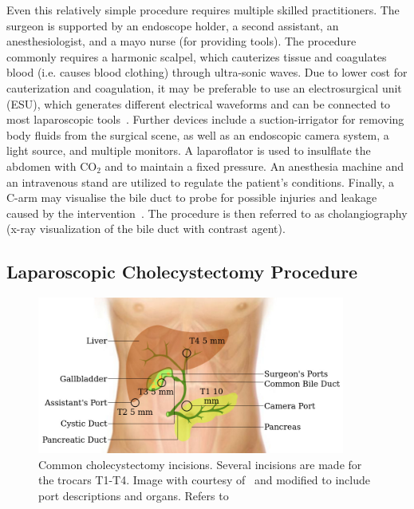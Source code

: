 Even this relatively simple procedure requires multiple skilled practitioners. The surgeon is supported by an endoscope holder, a second assistant, an anesthesiologist, and a mayo nurse (for providing tools). The procedure commonly requires a harmonic scalpel, which cauterizes tissue and coagulates blood (i.e. causes blood clothing) through ultra-sonic waves. Due to lower cost for cauterization and coagulation, it may be preferable to use an electrosurgical unit (ESU), which generates different electrical waveforms and can be connected to most laparoscopic tools~\cite{archana2018comparing}. Further devices include a suction-irrigator for removing body fluids from the surgical scene, as well as an endoscopic camera system, a light source, and multiple monitors. A laparoflator is used to insulflate the abdomen with $\text{CO}_2$ and to maintain a fixed pressure. An anesthesia machine and an intravenous stand are utilized to regulate the patient's conditions. Finally, a C-arm may visualise the bile duct to probe for possible injuries and leakage caused by the intervention~\cite{cuschieri1994intraoperative}. The procedure is then referred to as cholangiography (x-ray visualization of the bile duct with contrast agent).

\subsection{Laparoscopic Cholecystectomy Procedure}
\label{in:sec:cholecystectomy_procedure}
\begin{figure}[tb]
    \centering
    \includegraphics[width=0.9\textwidth]{introduction/fig/24_01_26_cholecystectomy_incisions.jpg}
    \caption{Common cholecystectomy incisions. Several incisions are made for the trocars T1-T4. Image with courtesy of~\cite{ALES5766} and modified to include port descriptions and organs. Refers to }
    \label{in:fig:cholecystectomy_incisions}
\end{figure}

